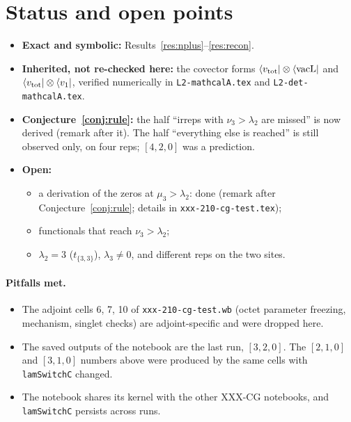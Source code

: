 \documentclass[11pt]{article}
\newcommand{\vacL}{\langle\mathrm{vacL}|}
\newcommand{\nb}[1]{\texttt{#1}}
\theoremstyle{definition}
\theoremstyle{remark}
\begin{document}
\section{Status and open points}
\begin{itemize}
\item \textbf{Exact and symbolic:} Results~\ref{res:nplus}--\ref{res:recon}.
\item \textbf{Inherited, not re-checked here:} the covector forms $\langle v_{\rm tot}|\otimes\vacL$ and $\langle v_{\rm tot}|\otimes\langle v_1|$, verified numerically in \nb{L2-mathcalA.tex} and \nb{L2-det-mathcalA.tex}.
\item \textbf{Conjecture~\ref{conj:rule}:} the half ``irreps with $\nu_3>\lambda_2$ are missed'' is now derived (remark after it). The half ``everything else is reached'' is still observed only, on four reps; $[4,2,0]$ was a prediction.
\item \textbf{Open:}
  \begin{itemize}
  \item a derivation of the zeros at $\mu_3>\lambda_2$: done (remark after Conjecture~\ref{conj:rule}; details in \nb{xxx-210-cg-test.tex});
  \item functionals that reach $\nu_3>\lambda_2$;
  \item $\lambda_2=3$ ($t_{\{3,3\}}$), $\lambda_3\neq0$, and different reps on the two sites.
  \end{itemize}
\end{itemize}

\paragraph{Pitfalls met.}
\begin{itemize}
\item The adjoint cells 6, 7, 10 of \nb{xxx-210-cg-test.wb} (octet parameter freezing, mechanism, singlet checks) are adjoint-specific and were dropped here.
\item The saved outputs of the notebook are the last run, $[3,2,0]$. The $[2,1,0]$ and $[3,1,0]$ numbers above were produced by the same cells with \nb{lamSwitchC} changed.
\item The notebook shares its kernel with the other XXX-CG notebooks, and \nb{lamSwitchC} persists across runs.
\end{itemize}

\end{document}
